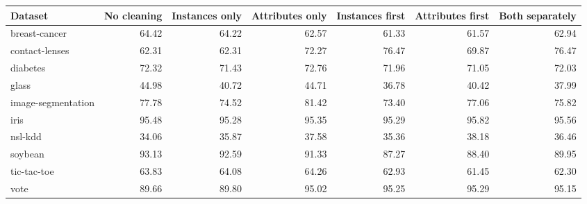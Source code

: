 \begin{tabular}{lrrrrrr}
\toprule
Dataset & No cleaning & Instances only & Attributes only & Instances first & Attributes first & Both separately \\
\midrule
breast-cancer & 64.42 & 64.22 & 62.57 & 61.33 & 61.57 & 62.94 \\
contact-lenses & 62.31 & 62.31 & 72.27 & 76.47 & 69.87 & 76.47 \\
diabetes & 72.32 & 71.43 & 72.76 & 71.96 & 71.05 & 72.03 \\
glass & 44.98 & 40.72 & 44.71 & 36.78 & 40.42 & 37.99 \\
image-segmentation & 77.78 & 74.52 & 81.42 & 73.40 & 77.06 & 75.82 \\
iris & 95.48 & 95.28 & 95.35 & 95.29 & 95.82 & 95.56 \\
nsl-kdd & 34.06 & 35.87 & 37.58 & 35.36 & 38.18 & 36.46 \\
soybean & 93.13 & 92.59 & 91.33 & 87.27 & 88.40 & 89.95 \\
tic-tac-toe & 63.83 & 64.08 & 64.26 & 62.93 & 61.45 & 62.30 \\
vote & 89.66 & 89.80 & 95.02 & 95.25 & 95.29 & 95.15 \\
\bottomrule
\end{tabular}
